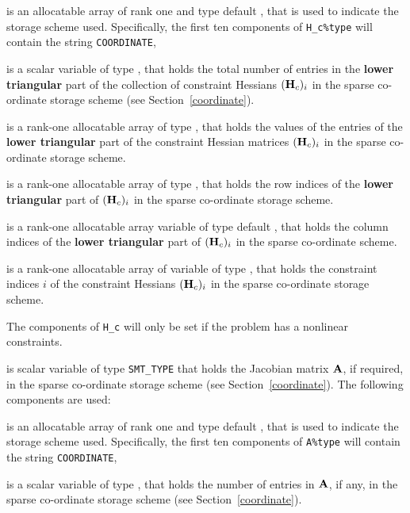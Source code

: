 \documentclass{galahad}
\begin{document}
\begin{description}
\begin{description}

 is an allocatable array of rank one and type default
\character, that is used to indicate the storage scheme used. Specifically,
the first ten components of {\tt H\_c\%type} will contain the
string {\tt COORDINATE},

 is a scalar variable of type \integer, that
holds the total number of entries in the {\bf lower triangular} part of 
the collection of constraint Hessians $({\mathbf{H}}_c)_i$
in the sparse co-ordinate storage scheme (see Section~\ref{coordinate}).

 is a rank-one allocatable array of type \realdp, that
holds the values of the entries of the {\bf lower triangular} part
of the constraint Hessian matrices $({\mathbf{H}}_c)_i$ 
in the sparse co-ordinate storage scheme.

 is a rank-one allocatable array of type \integer,
that holds the row indices of the {\bf lower triangular} part of 
$({\mathbf{H}}_c)_i$ in the sparse co-ordinate storage scheme.

 is a rank-one allocatable array variable of type default
\integer, that holds the column indices of the {\bf lower triangular} part of
$({\mathbf{H}}_c)_i$ in the sparse co-ordinate scheme.

 is a rank-one allocatable array of variable of type
\integer, that holds the constraint indices $i$
of the constraint Hessians $({\mathbf{H}}_c)_i$
in the sparse co-ordinate storage scheme.
\end{description}

The components of {\tt H\_c} will only be set if the problem has a
nonlinear constraints.

 is scalar variable of type {\tt SMT\_TYPE}
that holds the Jacobian matrix ${\mathbf{A}}$, if required,
in the sparse co-ordinate storage scheme (see Section~\ref{coordinate}).
The following components are used:

\begin{description}

 is an allocatable array of rank one and type default \character,
that is used to indicate the storage scheme used. Specifically,
the first ten components of {\tt A\%type} will contain the
string {\tt COORDINATE},

 is a scalar variable of type \integer, that
holds the number of entries in ${\mathbf{A}}$, if any,
in the sparse co-ordinate storage scheme (see Section~\ref{coordinate}).


\end{description}
\end{description}
\end{document}

